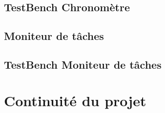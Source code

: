 \documentclass[a4paper,12pt]{report}
\begin{document}
		\subsection{TestBench Chronomètre}
			
			
		\subsection{Moniteur de tâches}
		
			
		\subsection{TestBench Moniteur de tâches}
		
		
	\section{Continuité du projet}
		\paragraph*{}
			
			
	\clearpage
\end{document}
